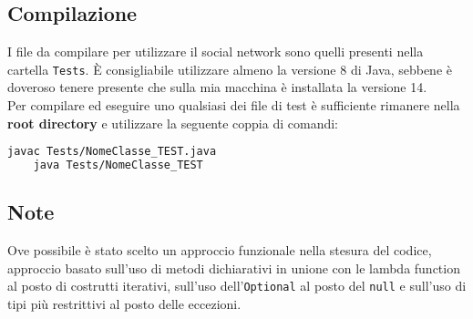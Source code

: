 \documentclass[a4paper,10pt]{article}
\begin{document}
\subsection*{Compilazione}

I file da compilare per utilizzare il social network sono quelli presenti nella cartella \texttt{Tests}. È consigliabile utilizzare almeno la versione 8 di Java,
sebbene è doveroso tenere presente che sulla mia macchina è installata la versione 14.\\
Per compilare ed eseguire uno qualsiasi dei file di test è sufficiente rimanere nella \textbf{root directory} e utilizzare la seguente coppia di comandi:
\begin{lstlisting}[language=sh]
    javac Tests/NomeClasse_TEST.java
    java Tests/NomeClasse_TEST
\end{lstlisting}

\subsection*{Note}
Ove possibile è stato scelto un approccio funzionale nella stesura del codice, approccio basato sull'uso di metodi dichiarativi in unione con le lambda function
al posto di costrutti iterativi, sull'uso dell'\texttt{Optional} al posto del \texttt{null} e sull'uso di tipi più restrittivi al posto delle eccezioni.
\end{document}
